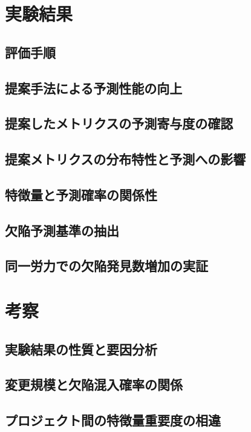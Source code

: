 \documentclass[12pt,a4j]{ltjsreport}
\begin{document}
\chapter{実験結果}
\section{評価手順}

\section{提案手法による予測性能の向上}

\section{提案したメトリクスの予測寄与度の確認}

\section{提案メトリクスの分布特性と予測への影響}

\section{特徴量と予測確率の関係性}

\section{欠陥予測基準の抽出}

\section{同一労力での欠陥発見数増加の実証}

\clearpage

\chapter{考察}
\section{実験結果の性質と要因分析}

\section{変更規模と欠陥混入確率の関係}

\section{プロジェクト間の特徴量重要度の相違}

\end{document}
